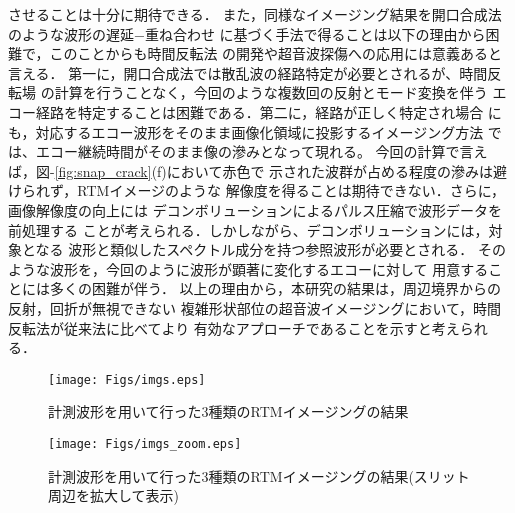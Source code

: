 させることは十分に期待できる．
%
また，同様なイメージング結果を開口合成法のような波形の遅延−重ね合わせ
に基づく手法で得ることは以下の理由から困難で，このことからも時間反転法
の開発や超音波探傷への応用には意義あると言える．
第一に，開口合成法では散乱波の経路特定が必要とされるが、時間反転場
の計算を行うことなく，今回のような複数回の反射とモード変換を伴う
エコー経路を特定することは困難である．第二に，経路が正しく特定され場合
にも，対応するエコー波形をそのまま画像化領域に投影するイメージング方法
では、エコー継続時間がそのまま像の滲みとなって現れる。 
今回の計算で言えば，{\rm 図}-\ref{fig:snap_crack}(f)において赤色で
示された波群が占める程度の滲みは避けられず，RTMイメージのような
解像度を得ることは期待できない．さらに，画像解像度の向上には
デコンボリューションによるパルス圧縮で波形データを前処理する
ことが考えられる．しかしながら、デコンボリューションには，対象となる
波形と類似したスペクトル成分を持つ参照波形が必要とされる．
そのような波形を，今回のように波形が顕著に変化するエコーに対して
用意することには多くの困難が伴う．
以上の理由から，本研究の結果は，周辺境界からの反射，回折が無視できない
複雑形状部位の超音波イメージングにおいて，時間反転法が従来法に比べてより
有効なアプローチであることを示すと考えられる．
\begin{figure}[htb]
\centering
	\texttt{[image: Figs/imgs.eps]}
	\caption{計測波形を用いて行った3種類のRTMイメージングの結果}
	\label{fig:imgs}
\end{figure}
\begin{figure}
\centering
	\texttt{[image: Figs/imgs\_zoom.eps]}
	\caption{計測波形を用いて行った3種類のRTMイメージングの結果(スリット周辺を拡大して表示)}
	\label{fig:imgs_zoom}
\end{figure}
